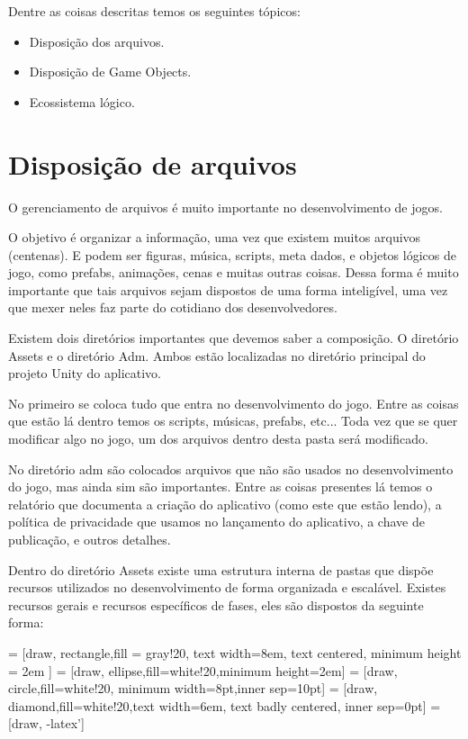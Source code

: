     Dentre as coisas descritas temos os seguintes tópicos:

    \begin{itemize}
        \item Disposição dos arquivos.
        \item Disposição de Game Objects.
        \item Ecossistema lógico.
    \end{itemize}

    \section{Disposição de arquivos}

    O gerenciamento de arquivos é muito importante no desenvolvimento de jogos.

    O objetivo é organizar a informação, uma vez que existem muitos arquivos (centenas). E podem ser figuras, música, scripts, meta dados, e objetos lógicos de jogo, como prefabs, animações, cenas e muitas outras coisas.
    Dessa forma é muito importante que tais arquivos sejam dispostos de uma forma inteligível, uma vez que mexer neles faz parte do cotidiano dos desenvolvedores.
        
    Existem dois diretórios importantes que devemos saber a composição. O diretório Assets e o diretório Adm. Ambos estão localizadas no diretório principal do projeto Unity do aplicativo. 

    No primeiro se coloca tudo que entra no desenvolvimento do jogo. Entre as coisas que estão lá dentro temos os scripts, músicas, prefabs, etc... Toda vez que se quer modificar algo no jogo, um dos arquivos dentro desta pasta será modificado.

    No diretório adm são colocados arquivos que não são usados no desenvolvimento do jogo, mas ainda sim são importantes. Entre as coisas presentes lá temos o relatório que documenta a criação do aplicativo (como este que estão lendo), a política de privacidade que usamos no lançamento do aplicativo, a chave de publicação, e outros detalhes.

    Dentro do diretório Assets existe uma estrutura interna de pastas que dispõe recursos utilizados no desenvolvimento de forma organizada e escalável. Existes recursos gerais e recursos específicos de fases, eles são dispostos da seguinte forma:

    \newpage

     = [draw, rectangle,fill = gray!20, text width=8em, text centered, minimum height = 2em ]
     = [draw, ellipse,fill=white!20,minimum height=2em]
     = [draw, circle,fill=white!20, minimum width=8pt,inner sep=10pt]
     = [draw, diamond,fill=white!20,text width=6em, text badly centered, inner sep=0pt]
     = [draw, -latex']

